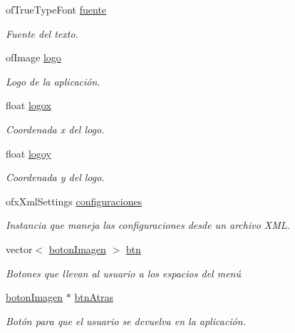 \begin{DoxyCompactItemize}
\item 
of\+True\+Type\+Font \hyperlink{classmenu_base_a8c48cc67dd9d789cf5a06c61333c8db9}{fuente}
\begin{DoxyCompactList}\small\item\em Fuente del texto. \end{DoxyCompactList}\item 
of\+Image \hyperlink{classmenu_base_a817536aa29cfe8f13d1e7c745e45b31d}{logo}
\begin{DoxyCompactList}\small\item\em Logo de la aplicación. \end{DoxyCompactList}\item 
float \hyperlink{classmenu_base_a97f2f1c174cadb12ae7b62f672fcde97}{logox}
\begin{DoxyCompactList}\small\item\em Coordenada x del logo. \end{DoxyCompactList}\item 
float \hyperlink{classmenu_base_a8bd56c156201d813c9c6da884cd98296}{logoy}
\begin{DoxyCompactList}\small\item\em Coordenada y del logo. \end{DoxyCompactList}\item 
ofx\+Xml\+Settings \hyperlink{classmenu_base_a07ca6fd4669759542b11d31eada55403}{configuraciones}
\begin{DoxyCompactList}\small\item\em Instancia que maneja las configuraciones desde un archivo X\+M\+L. \end{DoxyCompactList}\item 
vector$<$ \hyperlink{classboton_imagen}{boton\+Imagen} $>$ \hyperlink{classmenu_base_a6de979e3389d5918db62c75d886161d9}{btn}
\begin{DoxyCompactList}\small\item\em Botones que llevan al usuario a los espacios del menú \end{DoxyCompactList}\item 
\hyperlink{classboton_imagen}{boton\+Imagen} $\ast$ \hyperlink{classmenu_base_a28cf020839a96b7793388baf8a9e054d}{btn\+Atras}
\begin{DoxyCompactList}\small\item\em Botón para que el usuario se devuelva en la aplicación. \end{DoxyCompactList}\end{DoxyCompactItemize}


